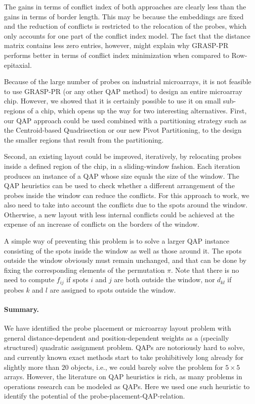 \documentclass[english]{lni}
\begin{document}
The gains in terms of conflict index of both approaches are clearly less than the
gains in terms of border length. This may be because the embeddings are fixed and the
reduction of conflicts is restricted to the relocation of the probes, which only
accounts for one part of the conflict index model. The fact that the distance matrix
contains less zero entries, however, might explain why GRASP-PR performs better in
terms of conflict index minimization when compared to Row-epitaxial.

Because of the large number of probes on industrial microarrays, it is not
feasible to use GRASP-PR (or any other QAP method) to design an
entire microarray chip. However, we showed that it is certainly possible to use
it on small sub-regions of a chip, which opens up the way for two interesting
alternatives. First, our QAP approach could be used combined with a partitioning
strategy such as the Centroid-based Quadrisection or our new Pivot Partitioning,
to the design the smaller regions that result from the partitioning.

Second, an existing layout could be improved, iteratively, by relocating probes
inside a defined region of the chip, in a sliding-window fashion.
Each iteration produces an instance of a QAP whose size equals
the size of the window. The QAP heuristics can be used to check whether
a different arrangement of the probes inside the window can reduce the conflicts.
For this approach to work, we also need to take
into account the conflicts due to the spots around the window. Otherwise, a
new layout with less internal conflicts could be achieved at the expense of an
increase of conflicts on the borders of the window.

A simple way of preventing this problem is to solve a larger QAP instance
consisting of the spots inside the window as well as those around it. The
spots outside the window obviously must remain unchanged, and that can be done
by fixing the corresponding elements of the permutation $\pi$. Note that
there is no need to compute $f_{ij}$ if spots $i$ and $j$ are both outside the
window, nor $d_{kl}$ if probes $k$ and $l$ are assigned to spots outside the
window.

\paragraph{Summary.}
We have identified the probe placement or microarray layout problem with
general distance-dependent and position-dependent weights as a (specially
structured) quadratic assignment problem. QAPs are notoriously hard to solve,
and currently known exact methods start to take prohibitively long already for
slightly more than $20$ objects, i.e., we could barely solve the problem for
$5\times 5$ arrays. However, the literature on QAP heuristics is rich,
as many problems in operations research can be modeled as QAPs. Here we used
one such heuristic to identify the potential of the
probe-placement-QAP-relation.
\end{document}
